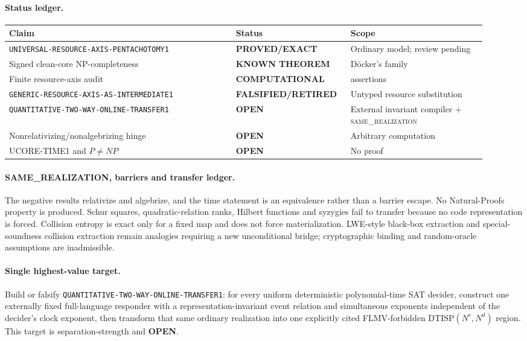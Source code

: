 \documentclass[11pt]{article}
\newcommand{\statusproved}{\textcolor{proved}{\textbf{PROVED/EXACT}}}
\newcommand{\statusopen}{\textcolor{openstatus}{\textbf{OPEN}}}
\newcommand{\statusretired}{\textcolor{retired}{\textbf{FALSIFIED/RETIRED}}}
\newcommand{\same}{\textnormal{\textsc{same\_realization}}}
\begin{document}
\paragraph{Status ledger.}
\begin{center}\scriptsize
\begin{tabular}{>{\raggedright\arraybackslash}p{0.45\linewidth}>{\raggedright\arraybackslash}p{0.20\linewidth}>{\raggedright\arraybackslash}p{0.27\linewidth}}
\toprule
Claim & Status & Scope\\ \midrule
\texttt{UNIVERSAL-RESOURCE-AXIS-PENTACHOTOMY1} & \statusproved & Ordinary model; review pending\\
Signed clean-core NP-completeness & \textbf{KNOWN THEOREM} & D\"ocker's family\\
Finite resource-axis audit & \textbf{COMPUTATIONAL} & 176 assertions\\
\texttt{GENERIC-RESOURCE-AXIS-AS-INTERMEDIATE1} & \statusretired & Untyped resource substitution\\
\texttt{QUANTITATIVE-TWO-WAY-ONLINE-TRANSFER1} & \statusopen & External invariant compiler + \same\\
Nonrelativizing/nonalgebrizing hinge & \statusopen & Arbitrary computation\\
UCORE-TIME1 and \(P\ne NP\) & \statusopen & No proof\\
\bottomrule
\end{tabular}
\end{center}

\paragraph{SAME\_REALIZATION, barriers and transfer ledger.}
The negative results relativize and algebrize, and the time statement is an
equivalence rather than a barrier escape.  No Natural-Proofs property is
produced.  Schur squares, quadratic-relation ranks, Hilbert functions and
syzygies fail to transfer because no code representation is forced.
Collision entropy is exact only for a fixed map and does not force
materialization.  LWE-style black-box extraction and special-soundness
collision extraction remain analogies requiring a new unconditional bridge;
cryptographic binding and random-oracle assumptions are inadmissible.

\paragraph{Single highest-value target.}
Build or falsify \texttt{QUANTITATIVE-TWO-WAY-ONLINE-TRANSFER1}: for every
uniform deterministic polynomial-time SAT decider, construct one externally
fixed full-language responder with a representation-invariant event relation
and simultaneous exponents independent of the decider's clock exponent, then
transform that same ordinary realization into one explicitly cited
FLMV-forbidden \(\mathrm{DTISP}(N^c,N^d)\) region.  This target is
separation-strength and \statusopen.
\end{document}
